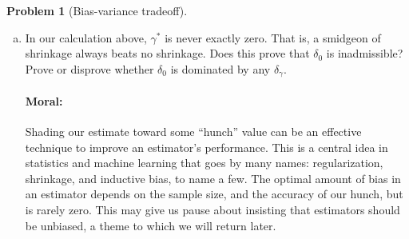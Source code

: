 \documentclass{article}
\theoremstyle{definition}
\newtheorem{problem}{Problem}
\begin{document}
\begin{problem}[Bias-variance tradeoff]
\begin{enumerate}[(a)]
    

  \item In our calculation above, $\gamma^*$ is never exactly zero. That is, a smidgeon of shrinkage always beats no shrinkage. Does this prove that $\delta_0$ is inadmissible? Prove or disprove whether $\delta_0$ is dominated by any $\delta_\gamma$.

    

\paragraph{Moral:} Shading our estimate toward some ``hunch'' value can be an effective technique to improve an estimator's performance. This is a central idea in statistics and machine learning that goes by many names: regularization, shrinkage, and inductive bias, to name a few. The optimal amount of bias in an estimator depends on the sample size, and the accuracy of our hunch, but is rarely zero. This may give us pause about insisting that estimators should be unbiased, a theme to which we will return later.

  \end{enumerate}
\end{problem}
\end{document}
